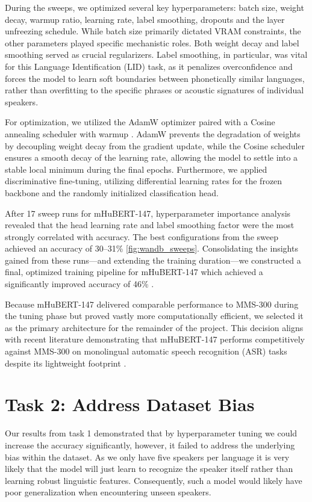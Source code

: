 \documentclass[11pt]{article}
\begin{document}
During the sweeps, we optimized several key hyperparameters: batch size, weight decay, warmup ratio, learning rate, label smoothing, dropouts and the layer unfreezing schedule. While batch size primarily dictated VRAM constraints, the other parameters played specific mechanistic roles. Both weight decay and label smoothing served as crucial regularizers. Label smoothing, in particular, was vital for this Language Identification (LID) task, as it penalizes overconfidence and forces the model to learn soft boundaries between phonetically similar languages, rather than overfitting to the specific phrases or acoustic signatures of individual speakers.

For optimization, we utilized the AdamW optimizer paired with a Cosine annealing scheduler with warmup \citep{adamw_cosine}. AdamW prevents the degradation of weights by decoupling weight decay from the gradient update, while the Cosine scheduler ensures a smooth decay of the learning rate, allowing the model to settle into a stable local minimum during the final epochs. Furthermore, we applied discriminative fine-tuning, utilizing differential learning rates for the frozen backbone and the randomly initialized classification head.

After 17 sweep runs for mHuBERT-147, hyperparameter importance analysis revealed that the head learning rate and label smoothing factor were the most strongly correlated with accuracy. The best configurations from the sweep achieved an accuracy of 30–31\% \ref{fig:wandb_sweeps}. Consolidating the insights gained from these runs—and extending the training duration—we constructed a final, optimized training pipeline for mHuBERT-147 which achieved a significantly improved accuracy of 46\% \citep{Code_hubert_best}.

Because mHuBERT-147 delivered comparable performance to MMS-300 during the tuning phase but proved vastly more computationally efficient, we selected it as the primary architecture for the remainder of the project. This decision aligns with recent literature demonstrating that mHuBERT-147 performs competitively against MMS-300 on monolingual automatic speech recognition (ASR) tasks despite its lightweight footprint \citep{mhubert_147_better}.


\section{Task 2: Address Dataset Bias}
 Our results from task 1 demonstrated that by hyperparameter tuning we could increase the accuracy significantly, however, it failed to address the underlying bias within the dataset. As we only have five speakers per language it is very likely that the model will just learn to recognize the speaker itself rather than learning robust linguistic features. Consequently, such a model would likely have poor generalization when encountering unseen speakers.
\end{document}
